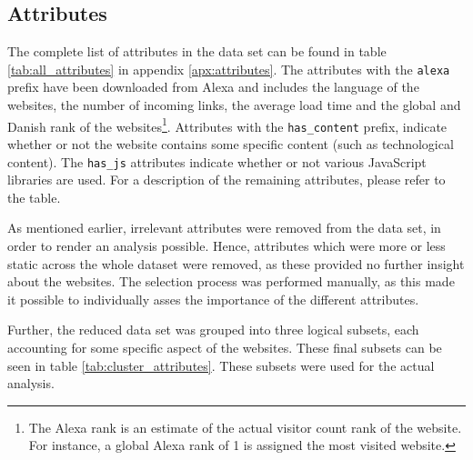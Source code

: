 
\subsection{Attributes}
\label{subsec:attributes}

The complete list of attributes in the data set can be found in table \ref{tab:all_attributes} in appendix \ref{apx:attributes}. The attributes with the \texttt{alexa} prefix have been downloaded from Alexa and includes the language of the websites, the number of incoming links, the average load time and the global and Danish rank of the websites\footnote{The Alexa rank is an estimate of the actual visitor count rank of the website. For instance, a global Alexa rank of 1 is assigned the most visited website.}. Attributes with the \texttt{has\_content} prefix, indicate whether or not the website contains some specific content (such as technological content). The \texttt{has\_js} attributes indicate whether or not various JavaScript libraries are used. For a description of the remaining attributes, please refer to the table.

As mentioned earlier, irrelevant attributes were removed from the data set, in order to render an analysis possible. Hence, attributes which were more or less static across the whole dataset were removed, as these provided no further insight about the websites. The selection process was performed manually, as this made it possible to individually asses the importance of the different attributes.

Further, the reduced data set was grouped into three logical subsets, each accounting for some specific aspect of the websites. These final subsets can be seen in table \ref{tab:cluster_attributes}. These subsets were used for the actual analysis.

